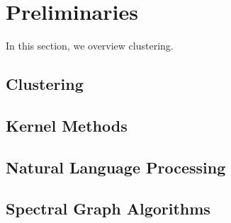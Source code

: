 \section{Preliminaries}
In this section, we overview clustering. 
\subsection{Clustering}
\subsection{Kernel Methods}
\subsection{Natural Language Processing}
\subsection{Spectral Graph Algorithms}
